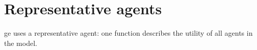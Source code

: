 \section{Representative agents \label{sec:repagents}}

\gls{ge} uses a representative agent: one function describes the utility of all agents in the model. 